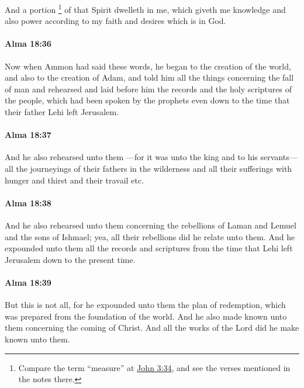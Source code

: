 			And a portion%
				\footnote{%
					Compare the term ``measure'' at \hyperref[JOHN-3-34]{John 3:34}, and see the verses mentioned in the notes there.
					} 
			of that Spirit dwelleth in me,
			which giveth me knowledge and also power
			according to my faith and desires which is in God.

		\paragraph{Alma 18:36} %
			\label{ALMA-18-36}

			Now when Ammon had said these words,
			he began to the creation of the world,
			and also to the creation of Adam,
			and told him all the things concerning the fall of man
			and rehearsed and laid before him
			the records and the holy scriptures of the people,
			which had been spoken by the prophets
			even down to the time that their father Lehi left Jerusalem.

		\paragraph{Alma 18:37} %
			\label{ALMA-18-37}

			And he also rehearsed unto them
			---for it was unto the king and to his servants---
			all the journeyings of their fathers in the wilderness
			and all their sufferings with hunger and thirst and their travail etc.

		\paragraph{Alma 18:38} %
			\label{ALMA-18-38}

			And he also rehearsed unto them
			concerning the rebellions of Laman and Lemuel and the sons of Ishmael;
			yea, all their rebellions did he relate unto them.
			And he expounded unto them all the records and scriptures
			from the time that Lehi left Jerusalem down to the present time.

		\paragraph{Alma 18:39} %
			\label{ALMA-18-39}

			But this is not all,
			for he expounded unto them the plan of redemption,
			which was prepared from the foundation of the world.
			And he also made known unto them concerning the coming of Christ.
			And all the works of the Lord did he make known unto them.

